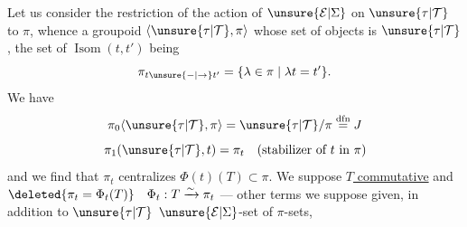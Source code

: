 
Let us consider the restriction of the action of $\unsure{\mathcal E|\Sigma}$ on $\unsure{\tau|\mathcal T}$ to $\pi$, whence a groupoid $\langle\unsure{\tau|\mathcal T},\pi\rangle$ whose set of objects is $\unsure{\tau|\mathcal T}$, the set of $\operatorname{Isom}(t,t')$ being
\[
\pi_{t\unsure{\mathbin{-}|\to}t'}=\{\lambda\in\pi\mid\lambda t=t'\}.
\]
 We have
\[
\pi_0\langle\unsure{\tau|\mathcal T},\pi\rangle=\unsure{\tau|\mathcal T}/\pi\overset{\mathrm{dfn}}{=}J
\]
\[
\pi_1(\unsure{\tau|\mathcal T},t)=\pi_t\quad(\text{stabilizer of }t\text{ in }\pi)
\]
and we find that $\pi_t$ centralizes $\Phi(t)(T)\subset\pi$. We suppose \uline{$T$ commutative} and $\deleted{\pi_t=\Phi_t(T)}\quad\Phi_t:T\xrightarrow{\sim}\pi_t$ ---  other terms we suppose given, in addition to $\unsure{\tau|\mathcal T}$ $\unsure{\mathcal E|\Sigma}$-set of $\pi$-sets,
